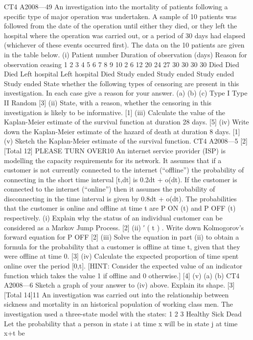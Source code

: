 CT4 A2008—49
An investigation into the mortality of patients following a specific type of major
operation was undertaken. A sample of 10 patients was followed from the date of the
operation until either they died, or they left the hospital where the operation was
carried out, or a period of 30 days had elapsed (whichever of these events occurred
first). The data on the 10 patients are given in the table below.
(i)
Patient number Duration of
observation
(days) Reason for
observation
ceasing
1
2
3
4
5
6
7
8
9
10 2
6
12
20
24
27
30
30
30
30 Died
Died
Died
Left hospital
Left hospital
Died
Study ended
Study ended
Study ended
Study ended
State whether the following types of censoring are present in this
investigation. In each case give a reason for your answer.
(a)
(b)
(c)
Type I
Type II
Random
[3]
(ii) State, with a reason, whether the censoring in this investigation is likely to be
informative.
[1]
(iii) Calculate the value of the Kaplan-Meier estimate of the survival function at
duration 28 days.
[5]
(iv) Write down the Kaplan-Meier estimate of the hazard of death at duration 8
days.
[1]
(v) Sketch the Kaplan-Meier estimate of the survival function.
CT4 A2008—5
[2]
[Total 12]
PLEASE TURN OVER10
An internet service provider (ISP) is modelling the capacity requirements for its
network. It assumes that if a customer is not currently connected to the internet
(“offline”) the probability of connecting in the short time interval [t,dt] is
0.2dt + o(dt). If the customer is connected to the internet (“online”) then it assumes
the probability of disconnecting in the time interval is given by 0.8dt + o(dt).
The probabilities that the customer is online and offline at time t are P ON (t) and
P OFF (t) respectively.
(i)
Explain why the status of an individual customer can be considered as a
Markov Jump Process. [2]
(ii) ′ ( t ) .
Write down Kolmogorov’s forward equation for P OFF [2]
(iii) Solve the equation in part (ii) to obtain a formula for the probability that a
customer is offline at time t, given that they were offline at time 0.
[3]
(iv) Calculate the expected proportion of time spent online over the period [0,t].
[HINT: Consider the expected value of an indicator function which takes the
value 1 if offline and 0 otherwise.]
[4]
(v) (a)
(b)
CT4 A2008—6
Sketch a graph of your answer to (iv) above.
Explain its shape.
[3]
[Total 14]11
An investigation was carried out into the relationship between sickness and mortality
in an historical population of working class men. The investigation used a three-state
model with the states:
1
2
3
Healthy
Sick
Dead
Let the probability that a person in state i at time x will be in state j at time x+t be
